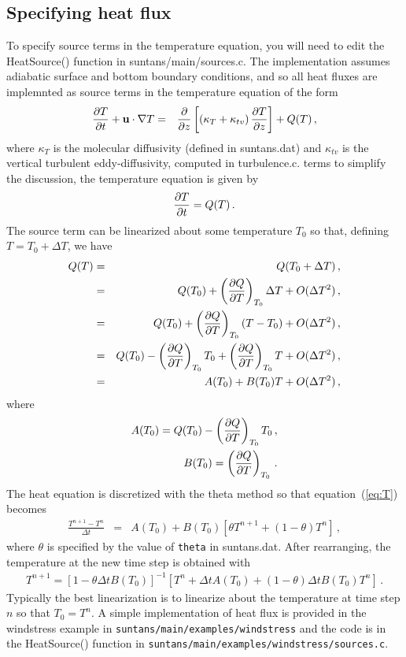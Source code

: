 \subsection{Specifying heat flux} \label{sec:heatflux}

To specify source terms in the temperature equation, you will need to edit the
HeatSource() function in suntans/main/sources.c.  The implementation assumes
adiabatic surface and bottom boundary conditions, and so all heat fluxes are implemnted
as source terms in the temperature equation of the form
\begin{eqnarray*}
\frac{\partial{T}}{\partial{t}} + \mathbf{u}\cdot\nabla T &=& \frac{\partial{}}{\partial{z}}\left[\left(\kappa_T + \kappa_{tv}\right) \frac{\partial{T}}{\partial{z}}\right] + Q(T)\,,
\end{eqnarray*}
where $\kappa_T$ is the molecular diffusivity (defined in suntans.dat) and $\kappa_{tv}$ is the
vertical turbulent eddy-diffusivity, computed in turbulence.c.  
terms to simplify the discussion, the temperature equation is given by
\begin{equation}\label{eq:T}
\frac{\partial{T}}{\partial{t}}  = Q(T)\,.
\end{equation}
The source term can be linearized about some temperature $T_0$ so that, defining $T=T_0 + \Delta T$,
we have
\begin{eqnarray*}
Q(T) &=& Q(T_0 + \Delta T)\,,\\
     &=& Q(T_0) + \left(\frac{\partial{Q}}{\partial{T}}\right)_{T_0}\Delta T  + O(\Delta T^2)\,,\\
     &=& Q(T_0) + \left(\frac{\partial{Q}}{\partial{T}}\right)_{T_0}\left(T - T_0\right)  + O(\Delta T^2)\,,\\
     &=& Q(T_0) - \left(\frac{\partial{Q}}{\partial{T}}\right)_{T_0}T_0 + \left(\frac{\partial{Q}}{\partial{T}}\right)_{T_0} T + O(\Delta T^2)\,,\\
     &=& A(T_0) + B(T_0) T + O(\Delta T^2)\,,
\end{eqnarray*}
where
\begin{eqnarray*}
A(T_0) = Q(T_0) - \left(\frac{\partial{Q}}{\partial{T}}\right)_{T_0}T_0\,,\\
B(T_0) = \left(\frac{\partial{Q}}{\partial{T}}\right)_{T_0}\,.
\end{eqnarray*}
The heat equation is discretized with the theta method so that equation~(\ref{eq:T}) becomes
\begin{eqnarray*}
\frac{T^{n+1} - T^n}{\Delta t} &=& A(T_0) + B(T_0)\left[\theta T^{n+1}+(1-\theta)T^n\right]\,,
\end{eqnarray*}
where $\theta$ is specified by the value of \verb+theta+ in suntans.dat.
After rearranging, the temperature at the new time step is obtained with
\begin{eqnarray*}
T^{n+1} = \left[1 - \theta \Delta t B(T_0)\right]^{-1}\left[T^n + \Delta t A(T_0) 
                  + (1-\theta) \Delta t B(T_0)T^n\right]\,.
\end{eqnarray*}
Typically the best linearization is to linearize about the temperature at time step $n$ so
that $T_0=T^n$. A simple implementation of heat flux is provided in the windstress example
in \verb+suntans/main/examples/windstress+ and the code is in the HeatSource() function in
\verb+suntans/main/examples/windstress/sources.c+.

